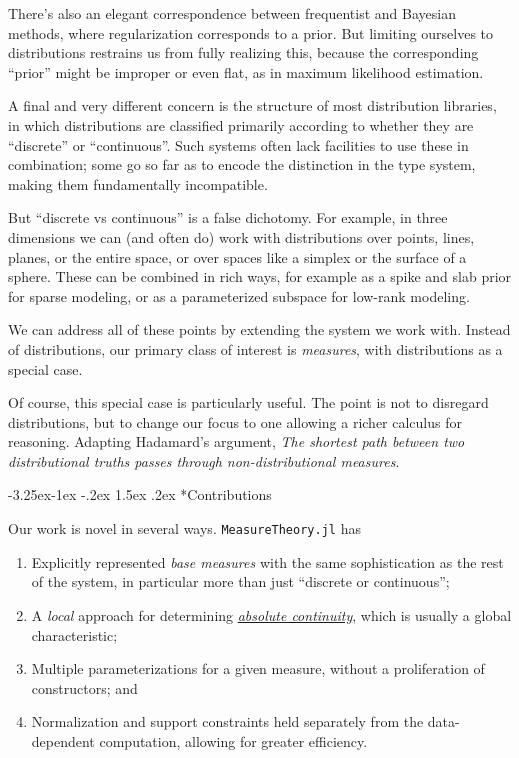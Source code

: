 \documentclass{juliacon}
\makeatletter
\renewcommand\subsection{\@startsection{subsection}{2}{\z@}%
{-3.25ex\@plus -1ex \@minus -.2ex}%
{1.5ex \@plus .2ex}%
{\normalfont\bfseries}}
\makeatother
\begin{document}
There's also an elegant correspondence between frequentist and Bayesian methods, where regularization corresponds to a prior. But limiting ourselves to distributions restrains us from fully realizing this, because the corresponding ``prior'' might be improper or even flat, as in maximum likelihood estimation.

A final and very different concern is the structure of most distribution libraries, in which distributions are classified primarily according to whether they are ``discrete'' or ``continuous''. Such systems often lack facilities to use these in combination; some go so far as to encode the distinction in the type system, making them fundamentally incompatible.

But ``discrete vs continuous'' is a false dichotomy. For example, in three dimensions we can (and often do) work with distributions over points, lines, planes, or the entire space, or over spaces like a simplex or the surface of a  sphere. These can be combined in rich ways, for example as a spike and slab prior for sparse modeling, or as a parameterized subspace for low-rank modeling.

We can address all of these points by extending the system we work with. Instead of distributions, our primary class of interest is \emph{measures}, with distributions as a special case.

Of course, this special case is particularly useful. The point is not to disregard distributions, but to change our focus to one allowing a richer calculus for reasoning. Adapting Hadamard's argument, 
\emph{The shortest path between two distributional truths passes through  non-distributional measures}.    


\subsection*{Contributions}

Our work is novel in several ways. \verb|MeasureTheory.jl| has
\begin{enumerate}
    \item Explicitly represented \emph{base measures} with the same sophistication as the rest of the system, in particular more than just ``discrete or continuous'';
    \item A \emph{local} approach for determining \href{https://en.wikipedia.org/wiki/Absolute_continuity}{\emph{absolute continuity}}, which is usually a global characteristic;
    \item Multiple parameterizations for a given measure, without a proliferation of constructors; and
    \item Normalization and support constraints held separately from the data-dependent computation, allowing for greater efficiency.
\end{enumerate}
\end{document}
